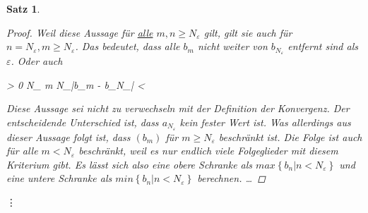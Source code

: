 \documentclass{article}
\newtheorem{thm}{Satz}[section]
\newenvironment{aleq*}{\begin{equation*}\begin{aligned}}{\end{aligned}\end{equation*}}
\begin{document}
\begin{thm}
\begin{proof}
			Weil diese Aussage für \underline{alle} \(m,n \geq N_\varepsilon\) gilt, gilt sie auch für\\ \(n=N_\varepsilon,m\geq N_\varepsilon\). Das bedeutet, dass alle \(b_m\) nicht weiter von \(b_{N_\varepsilon}\) entfernt sind als \(\varepsilon\). Oder auch
			\begin{aleq*}
				\forall \varepsilon > 0 \colon \exists N_\varepsilon \in {} \colon \forall m \geq N_\varepsilon \colon |b_m - b_{N_\varepsilon}| < \varepsilon \text{.}
			\end{aleq*}
			
			Diese Aussage sei nicht zu verwechseln mit der Definition der Konvergenz. Der entscheidende Unterschied ist, dass \(a_{N_\varepsilon}\) kein fester Wert ist. Was allerdings aus dieser Aussage folgt ist, dass \((b_m)\) für \(m \geq N_\varepsilon\) beschränkt ist. Die Folge ist auch für alle \(m < N_\varepsilon\) beschränkt, weil es nur endlich viele Folgeglieder mit diesem Kriterium gibt. Es lässt sich also eine obere Schranke als \(max \left\lbrace b_n | n < N_\varepsilon \right\rbrace\) und eine untere Schranke als \(min \left\lbrace b_n | n < N_\varepsilon \right\rbrace\) berechnen.
			\dots
		\end{proof}
	\end{thm}
	
	\vdots
\end{document}
